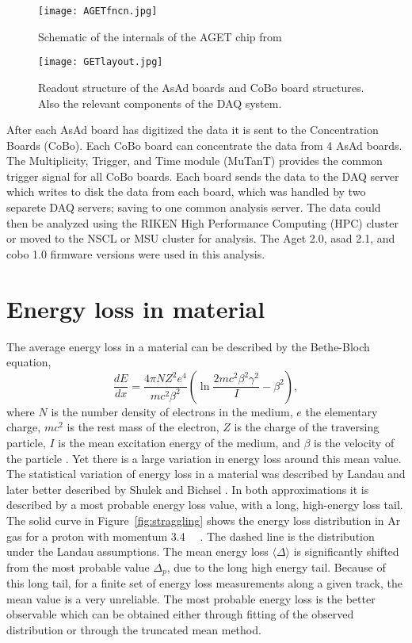 \begin{figure}[!htb]
\centering
\texttt{[image: AGETfncn.jpg]}
\caption{Schematic of the internals of the AGET chip from \cite{get2}}
\label{fig:aget}
\end{figure}


\begin{figure}[!htb]
\centering
\texttt{[image: GETlayout.jpg]}
\caption{Readout structure of the AsAd boards and CoBo board structures. Also the relevant components of the DAQ system.}
\label{fig:coboDAQ}
\end{figure}

After each AsAd board has digitized the data it is sent to the Concentration Boards (CoBo). Each CoBo board can concentrate the data from 4 AsAd boards. The Multiplicity, Trigger, and Time module (MuTanT) \cite{get} provides the common trigger signal for all CoBo boards.  Each board sends the data to the DAQ server which writes to disk the data from each board, which was handled by two separete DAQ servers; saving to one common analysis server. The data could then be analyzed using the RIKEN High Performance Computing (HPC) cluster or moved to the NSCL or MSU cluster for analysis. The Aget 2.0, asad 2.1, and cobo 1.0 firmware versions were used in this analysis. 

\section{Energy loss in material}
\label{sec:energyloss}

The average energy loss in a material can be described by the Bethe-Bloch equation,
\begin{equation}\label{eq:bb}
\frac{dE}{dx} = \frac{4\pi NZ^2e^4}{mc^2\beta^2} (\ln \frac{2mc^2\beta^2\gamma^2}{I} - \beta^2),
\end{equation}
where $N$ is the number density of electrons in the medium, $e$ the elementary charge, $mc^2$ is the rest mass of the electron, $Z$ is the charge of the traversing particle, $I$ is the mean excitation energy of the medium, and $\beta$ is the velocity of the particle \cite{blumrol}. Yet there is a large variation in energy loss around this mean value. The statistical variation of energy loss in a material was described by Landau \cite{landau} and later better described by Shulek \cite{shulek} and Bichsel \cite{bichsel1}. In both approximations it is described by a most probable energy loss value, with a long, high-energy loss tail. The solid curve in Figure~\ref{fig:straggling} shows the energy loss distribution in Ar gas for a proton with momentum \SI{3.4}{\giga\eVperc} \cite{bichsel}. The dashed line is the distribution under the Landau assumptions. The mean energy loss $\langle\Delta\rangle$ is significantly shifted from the most probable value $\Delta_p$, due to the long high energy tail.  Because of this long tail, for a finite set of energy loss measurements along a given track, the mean value is a very unreliable. The most probable energy loss is the better observable which can be obtained either through fitting of the observed distribution or through the truncated mean method. 

